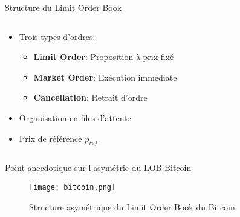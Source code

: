 \documentclass[aspectratio=169]{beamer}  %
\begin{document}
\begin{frame}{Structure du Limit Order Book}
    \begin{columns}
        \begin{column}{0.6\textwidth}
            \begin{itemize}
                \item Trois types d'ordres:
                \begin{itemize}
                    \item \textbf{Limit Order}: Proposition à prix fixé
                    \item \textbf{Market Order}: Exécution immédiate
                    \item \textbf{Cancellation}: Retrait d'ordre
                \end{itemize}
                \item Organisation en files d'attente
                \item Prix de référence $p_{ref}$
            \end{itemize}
        \end{column}
        \begin{column}{0.4\textwidth}
        \end{column}
    \end{columns}
\end{frame}

\begin{frame}{Point anecdotique sur l'asymétrie du LOB Bitcoin}
    \begin{figure}
        \centering
        \texttt{[image: bitcoin.png]}
        \caption{Structure asymétrique du Limit Order Book du Bitcoin}
    \end{figure}
\end{frame}
\end{document}
